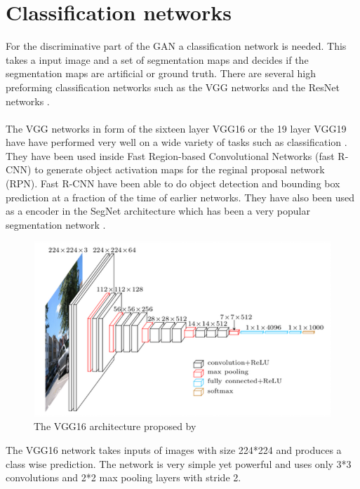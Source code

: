 \documentclass{kththesis}
\begin{document}
\section{Classification networks}
For the discriminative part of the GAN a classification network is needed. This takes a input image and a set of segmentation maps and decides if the segmentation maps are artificial or ground truth. There are several high preforming classification networks such as the VGG networks \parencite{simonyan_very_2014} and the ResNet networks \parencite{he_deep_2015}.\\
\\
The VGG networks in form of the sixteen layer VGG16 or the 19 layer VGG19 have have performed very well on a wide variety of tasks such as classification \parencite{simonyan_very_2014}. They have been used inside Fast Region-based Convolutional Networks (fast R-CNN) \parencite{ren_faster_2015, girshick_fast_2015} to generate object activation maps for the reginal proposal network (RPN). Fast R-CNN have been able to do object detection and bounding box prediction at a fraction of the time of earlier networks. They have also been used as a encoder in the SegNet architecture which has been a very popular segmentation network \parencite{badrinarayanan_segnet:_2015}.
\begin{figure}[h!]
  \centering
      \includegraphics[scale=0.5]{vgg}
  \caption{The VGG16 architecture proposed by \cite{simonyan_very_2014}} \label{fig:vgg}
\end{figure}
The VGG16 network takes inputs of images with size 224*224 and produces a class wise prediction. The network is very simple yet powerful and uses only 3*3 convolutions and 2*2 max pooling layers with stride 2.\\
\\
\end{document}
